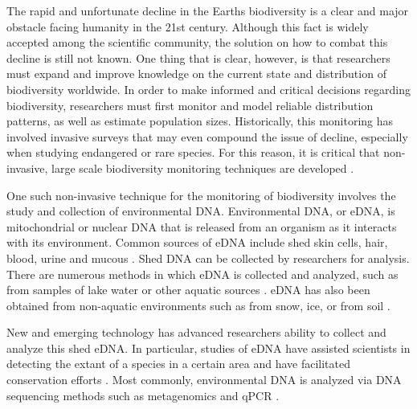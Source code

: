 \label{chapter:introduction}





\hspace{4mm} 

The rapid and unfortunate decline in the Earth\textsc{}s biodiversity is a clear and major obstacle facing humanity in the 21st century. Although this fact is widely accepted among the scientific community, the solution on how to combat this decline is still not known. One thing that is clear, however, is that researchers must expand and improve knowledge on the current state and distribution of biodiversity worldwide. In order to make informed and critical decisions regarding biodiversity, researchers must first monitor and model reliable distribution patterns, as well as estimate population sizes. Historically, this monitoring has involved invasive surveys that may even compound the issue of decline, especially when studying endangered or rare species. For this reason, it is critical that non-invasive, large scale biodiversity monitoring techniques are developed \citep{ednamonitoring}.


\vspace{5mm}


One such non-invasive technique for the monitoring of biodiversity involves the study and collection of environmental DNA. Environmental DNA, or eDNA, is mitochondrial or nuclear DNA that is released from an organism as it interacts with its environment.  Common sources of eDNA include shed skin cells, hair, blood, urine and mucous \citep{forestry}. Shed DNA can be collected by researchers for analysis. There are numerous methods in which eDNA is collected and analyzed, such as from samples of lake water \citep{goby} or other aquatic sources \citep{mussels}. eDNA has also been obtained from non-aquatic environments such as from snow, ice, or from soil \citep{soil}.

\newpage

 New and emerging technology has advanced researchers\textsc{} ability to collect and analyze this shed eDNA. In particular, studies of eDNA have assisted scientists in detecting the extant of a species in a certain area and have facilitated conservation efforts \citep{speciesDetection,limitations}. Most commonly, environmental DNA is analyzed via DNA sequencing methods such as metagenomics and qPCR \citep{geneexpression}.




